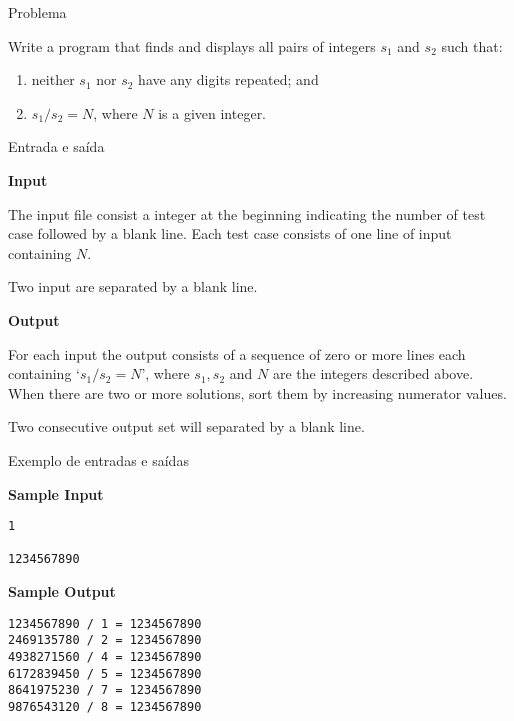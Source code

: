 
\begin{frame}[fragile]{Problema}

Write a program that finds and displays all pairs of integers $s_1$ and $s_2$ such that:

\begin{enumerate}
    \item neither $s_1$ nor $s_2$ have any digits repeated; and
    \item $s_1/s_2 = N$, where $N$ is a given integer.
\end{enumerate}

\end{frame}

\begin{frame}[fragile]{Entrada e saída}

\textbf{Input}

The input file consist a integer at the beginning indicating the number of test case followed by a 
blank line. Each test case consists of one line of input containing $N$.

Two input are separated by a blank line.

\vspace{0.1in}

\textbf{Output}

For each input the output consists of a sequence of zero or more lines each containing ‘$s_1 / 
s_2 = N$’, where $s_1, s_2$ and $N$ are the integers described above. When there are two or more 
solutions, sort them by increasing numerator values.

Two consecutive output set will separated by a blank line.

\end{frame}


\begin{frame}[fragile]{Exemplo de entradas e saídas}

\begin{minipage}[t]{0.45\textwidth}
\textbf{Sample Input}
\begin{verbatim}
1

1234567890
\end{verbatim}
\end{minipage}
\begin{minipage}[t]{0.5\textwidth}
\textbf{Sample Output}
\begin{verbatim}
1234567890 / 1 = 1234567890
2469135780 / 2 = 1234567890
4938271560 / 4 = 1234567890
6172839450 / 5 = 1234567890
8641975230 / 7 = 1234567890
9876543120 / 8 = 1234567890
\end{verbatim}
\end{minipage}
\end{frame}

